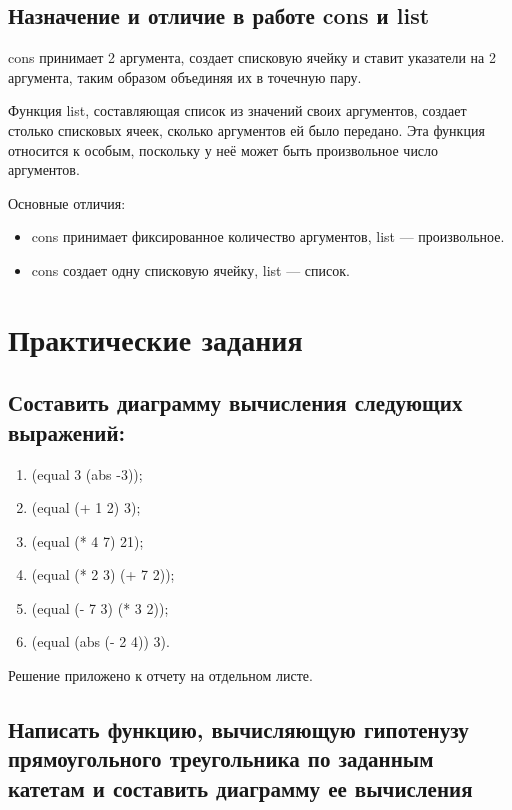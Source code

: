 \documentclass[12pt]{report}
\begin{document}
\section{Назначение и отличие в работе cons и list}

cons принимает 2 аргумента, создает списковую ячейку и ставит указатели на 2 аргумента, таким образом объединяя их в точечную пару.

Функция list, составляющая список из значений своих аргументов, создает столько списковых ячеек, сколько аргументов ей было передано. Эта функция относится к особым, поскольку у неё может быть произвольное число аргументов.

Основные отличия:

\begin{itemize}
	\item cons принимает фиксированное количество аргументов, list --- произвольное. 
	\item cons создает одну списковую ячейку, list --- список.
\end{itemize}

\chapter{Практические задания}	

\section{Составить диаграмму вычисления следующих выражений:}

\begin{enumerate}
    \item (equal 3 (abs -3));
    \item (equal (+ 1 2) 3);
    \item (equal (* 4 7) 21);
    \item (equal (* 2 3) (+ 7 2));
    \item (equal (- 7 3) (* 3 2));
    \item (equal (abs (- 2 4)) 3).
\end{enumerate}

Решение приложено к отчету на отдельном листе.


\section{Написать функцию, вычисляющую гипотенузу прямоугольного треугольника по заданным катетам и составить диаграмму ее вычисления}
\end{document}

